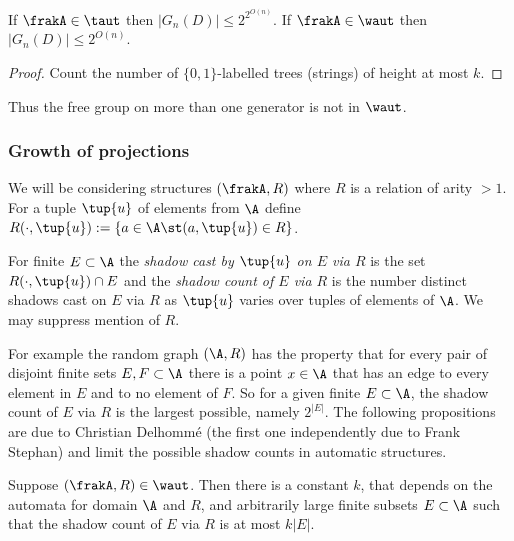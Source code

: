 \begin{corollary} 
If $\frakA \in \taut$ then $|G_n(D)| \leq 2^{2^{O(n)}}$. If $\frakA \in \waut$ then 
$|G_n(D)| \leq 2^{O(n)}$.
\end{corollary}
\begin{proof}
Count the number of $\{0,1\}$-labelled trees (strings) of height at most $k$.
\end{proof}

Thus the free group on more than one generator is not in $\waut$.%

\subsubsection*{Growth of projections}

We will be considering structures $(\frakA,R)$ where $R$ is a relation of arity $> 1$. For a tuple $\tup{u}$ of elements from $\A$ define
$R(\cdot,\tup{u}) := \{a \in \A \st (a,\tup{u}) \in R\}$.

\begin{definition}
For finite $E \subset \A$ the  {\em shadow cast by $\tup{u}$ on $E$ via $R$} is the set 
$R(\cdot,\tup{u}) \cap E$ and the {\em shadow count of $E$ via $R$} is the number distinct shadows
cast on $E$ via $R$ as $\tup{u}$ varies over tuples of elements of $\A$. We may suppress mention of $R$.
\end{definition}

For example the random graph $(\A,R)$ has the property that for every pair of disjoint finite sets $E,F \subset \A$ there is a point $x \in \A$ that has an edge to every element in $E$ and to no element of $F$. So for a given finite $E \subset \A$, the shadow count of $E$ via $R$ is 
the largest possible, namely $2^{|E|}$. The following propositions are due to Christian Delhomm{\'e} \cite{Delh04} (the first one independently due to Frank Stephan) and limit the possible shadow counts in automatic structures.

\begin{proposition}
Suppose $(\frakA,R) \in \waut$.
Then there is a constant $k$,  that depends on the automata for domain ${\A}$ and $R$, and arbitrarily large finite subsets $E \subset {\A}$ such
that the shadow count of $E$ via $R$ is at most $k|E|$.
\end{proposition}

